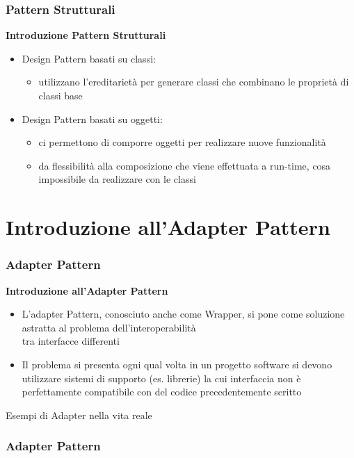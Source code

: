 \documentclass[aspectratio=43]{beamer}
\begin{document}
\begin{frame}
	\frametitle{ Pattern Strutturali}
	\textbf{Introduzione Pattern Strutturali}\pause
	\begin{itemize}
		\item Design Pattern basati su classi:\pause
		\begin{itemize}
			\item utilizzano l’ereditarietà per generare classi che combinano le proprietà di classi base\pause 
		\end{itemize}
		\item Design Pattern basati su oggetti:\pause
		\begin{itemize}
			\item ci permettono di comporre oggetti per realizzare nuove funzionalità\pause
			\item da flessibilità alla composizione che viene effettuata a run-time, cosa impossibile da realizzare con le classi 
		\end{itemize}
	\end{itemize}
\end{frame}

\section{Introduzione all'Adapter Pattern}

\begin{frame}
	\frametitle{ Adapter Pattern}
	\textbf{Introduzione all'Adapter Pattern}\pause
	\begin{itemize}
		\item L'adapter Pattern, conosciuto anche come Wrapper, si pone come soluzione astratta al problema dell'interoperabilità\\ tra interfacce differenti\pause
		\item Il problema si presenta ogni qual volta in un progetto software si devono utilizzare sistemi di supporto (es. librerie) la cui interfaccia non è perfettamente compatibile con del codice precedentemente scritto
	\end{itemize}
\end{frame}

\begin{frame}
	\centerline{Esempi di Adapter nella vita reale}
\end{frame}

\begin{frame}
	\frametitle{ Adapter Pattern}
	\begin{figure}[h!]
	\end{figure}
\end{frame}
\end{document}
